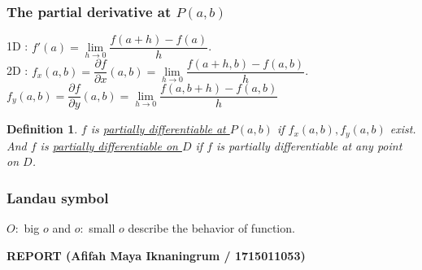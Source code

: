 \documentclass[a4paper,10pt]{article}
\newtheorem{defi}{Definition}
\begin{document}
\subsubsection{The partial derivative at $ P(a,b) $}
1D : $ f\prime(a) = \lim\limits_{h\rightarrow 0} \dfrac{f(a+h)-f(a)}{h} $.\\
2D : $ f_{x}(a,b) = \dfrac{\partial f}{\partial x} (a,b) = \lim\limits_{h\rightarrow 0} \dfrac{f(a+h,b)-f(a,b)}{h} $.\\
$ f_{y}(a,b) = \dfrac{\partial f}{\partial y} (a,b) = \lim\limits_{h\rightarrow 0} \dfrac{f(a,b+h)-f(a,b)}{h} $

\begin{defi}
	$ f $ is \underline{partially differentiable at $ P(a,b) $} if $ f_{x}(a,b), f_{y}(a,b) $ exist. And $ f $ is \underline{partially differentiable on $ D $} if $ f $ is partially differentiable at any point on $ D $.
\end{defi}

\subsubsection{Landau symbol}
$ O : $ big $ o $ and $ o : $ small $ o $ describe the behavior of function.

\newpage
\textbf{REPORT (Afifah Maya Iknaningrum / 1715011053)}\\ \\
\end{document}
